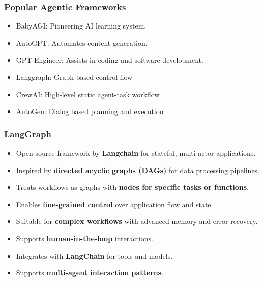 \begin{frame}[fragile]\frametitle{Popular Agentic Frameworks}

  \begin{itemize}
    \item BabyAGI: Pioneering AI learning system.
    \item AutoGPT: Automates content generation.
    \item GPT Engineer: Assists in coding and software development.
	\item Langgraph: Graph-based control flow
	\item CrewAI: High-level static agent-task workflow
    \item AutoGen: Dialog based planning and execution
  \end{itemize}
\end{frame}

\begin{frame}[fragile]\frametitle{LangGraph}
\begin{itemize}
    \item Open-source framework by \textbf{Langchain} for stateful, multi-actor applications.
    \item Inspired by \textbf{directed acyclic graphs (DAGs)} for data processing pipelines.
    \item Treats workflows as graphs with \textbf{nodes for specific tasks or functions}.
    \item Enables \textbf{fine-grained control} over application flow and state.
    \item Suitable for \textbf{complex workflows} with advanced memory and error recovery.
    \item Supports \textbf{human-in-the-loop} interactions.
    \item Integrates with \textbf{LangChain} for tools and models.
    \item Supports \textbf{multi-agent interaction patterns}.
\end{itemize}
\end{frame}

